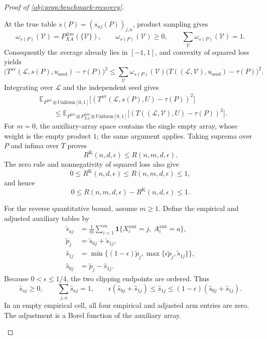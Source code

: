 \begin{proof}[Proof of \cref{obj:prop:benchmark-recovery}]
\begin{enumerate}
At the true table \(s(P)=(s_{aj}(P))_{j,a}\), product sampling gives
\[
\omega_{s(P)}(\mathcal V)
=P_{XA}^{\otimes m}(\{\mathcal V\}),
\qquad
\omega_{s(P)}(\mathcal V)\ge0,
\qquad
\sum_{\mathcal V}\omega_{s(P)}(\mathcal V)=1.
\]
Consequently the average already lies in \([-1,1]\), and convexity of squared loss yields
\[
\bigl(T^{\mathrm{av}}(\mathcal L,s(P),u_{\mathrm{seed}})
-\tau(P)\bigr)^2
\le
\sum_{\mathcal V}\omega_{s(P)}(\mathcal V)
\bigl(T((\mathcal L,\mathcal V),u_{\mathrm{seed}})
-\tau(P)\bigr)^2.
\]
Integrating over \(\mathcal L\) and the independent seed gives
\[
\begin{aligned}
&\mathbb E_{P^{\otimes n}\otimes\mathrm{Uniform}[0,1]}
\bigl[(T^{\mathrm{av}}(\mathcal L,s(P),U)-\tau(P))^2\bigr]\\
&\qquad\le
\mathbb E_{P^{\otimes n}\otimes P_{XA}^{\otimes m}
\otimes\mathrm{Uniform}[0,1]}
\bigl[(T((\mathcal L,\mathcal V),U)-\tau(P))^2\bigr].
\end{aligned}
\]
For \(m=0\), the auxiliary-array space contains the single empty array, whose weight is the empty product \(1\); the same argument applies. Taking suprema over \(P\) and infima over \(T\) proves
\[
R^{\mathrm K}(n,d,\epsilon)\le R(n,m,d,\epsilon).
\]
The zero rule and nonnegativity of squared loss also give
\[
0\le R^{\mathrm K}(n,d,\epsilon)
\le R(n,m,d,\epsilon)\le1,
\]
and hence
\[
0\le R(n,m,d,\epsilon)-R^{\mathrm K}(n,d,\epsilon)\le1.
\]

For the reverse quantitative bound, assume \(m\ge1\). Define the empirical and adjusted auxiliary tables by
\[
\begin{aligned}
\widetilde s_{aj}
&=\frac1m\sum_{i=1}^m
\mathbf1\{X_i^{\mathrm{aux}}=j,\ A_i^{\mathrm{aux}}=a\},\\
\widetilde p_j&=\widetilde s_{0j}+\widetilde s_{1j},\\
\widehat s_{1j}
&=\min\{(1-\epsilon)\widetilde p_j,
          \max\{\epsilon\widetilde p_j,\widetilde s_{1j}\}\},\\
\widehat s_{0j}&=\widetilde p_j-\widehat s_{1j}.
\end{aligned}
\]
Because \(0<\epsilon\le1/4\), the two clipping endpoints are ordered. Thus
\[
\widehat s_{aj}\ge0,\qquad
\sum_{j,a}\widehat s_{aj}=1,\qquad
\epsilon(\widehat s_{0j}+\widehat s_{1j})
\le\widehat s_{1j}
\le(1-\epsilon)(\widehat s_{0j}+\widehat s_{1j}).
\]
In an empty empirical cell, all four empirical and adjusted arm entries are zero. The adjustment is a Borel function of the auxiliary array.


\end{enumerate}
\end{proof}
